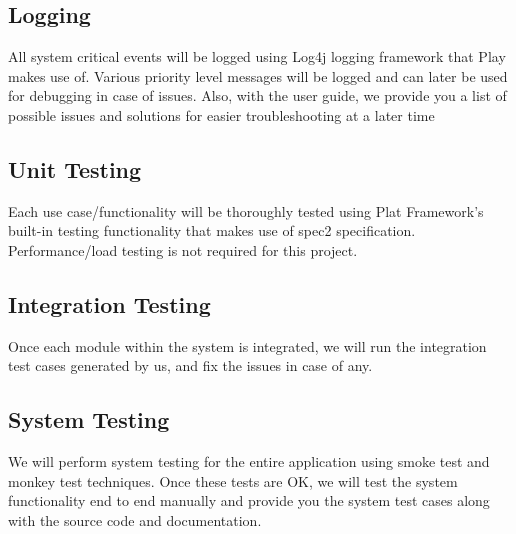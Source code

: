 \documentclass[hidelinks,a4paper]{article}
\begin{document}
	\subsection{Logging}
	All system critical events will be logged using Log4j logging framework that Play makes use of. Various priority level messages will be logged and can later be used for debugging in case of issues. Also, with the user guide, we provide you a list of possible issues and solutions for easier troubleshooting at a later time
	\subsection{Unit Testing}
	Each use case/functionality will be thoroughly tested using Plat Framework's built-in testing functionality that makes use of spec2 specification. Performance/load testing is not required for this project.
	\subsection{Integration Testing}
	Once each module within the system is integrated, we will run the integration test cases generated by us, and fix the issues in case of any.
	\subsection{System Testing}
	We will perform system testing for the entire application using smoke test and monkey test techniques. Once these tests are OK, we will test the system functionality end to end manually and provide you the system test cases along with the source code and documentation.
				
\end{document}
